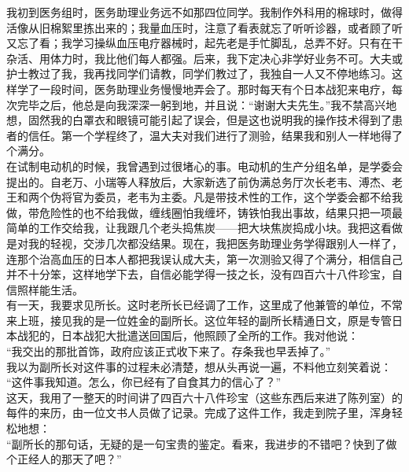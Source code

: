 我初到医务组时，医务助理业务远不如那四位同学。我制作外科用的棉球时，做得活像从旧棉絮里拣出来的；我量血压时，注意了看表就忘了听听诊器，或者顾了听又忘了看；我学习操纵血压电疗器械时，起先老是手忙脚乱，总弄不好。只有在干杂活、用体力时，我比他们每人都强。后来，我下定决心非学好业务不可。大夫或护士教过了我，我再找同学们请教，同学们教过了，我独自一人又不停地练习。这样学了一段时间，医务助理业务慢慢地弄会了。那时每天有个日本战犯来电疗，每次完毕之后，他总是向我深深一躬到地，并且说：“谢谢大夫先生。”我不禁高兴地想，固然我的白罩衣和眼镜可能引起了误会，但是这也说明我的操作技术得到了患者的信任。第一个学程终了，温大夫对我们进行了测验，结果我和别人一样地得了个满分。\\

在试制电动机的时候，我曾遇到过很堵心的事。电动机的生产分组名单，是学委会提出的。自老万、小瑞等人释放后，大家新选了前伪满总务厅次长老韦、溥杰、老王和两个伪将官为委员，老韦为主委。凡是带技术性的工作，这个学委会都不给我做，带危险性的也不给我做，缠线圈怕我缠坏，铸铁怕我出事故，结果只把一项最简单的工作交给我，让我跟几个老头捣焦炭——把大块焦炭捣成小块。我把这看做是对我的轻视，交涉几次都没结果。现在，我把医务助理业务学得跟别人一样了，连那个治高血压的日本人都把我误认成大夫，第一次测验又得了个满分，相信自己并不十分笨，这样地学下去，自信必能学得一技之长，没有四百六十八件珍宝，自信照样能生活。\\

有一天，我要求见所长。这时老所长已经调了工作，这里成了他兼管的单位，不常来上班，接见我的是一位姓金的副所长。这位年轻的副所长精通日文，原是专管日本战犯的，日本战犯大批遣送回国后，他照顾了全所的工作。我对他说：\\

“我交出的那批首饰，政府应该正式收下来了。存条我也早丢掉了。”\\

我以为副所长对这件事的过程未必清楚，想从头再说一遍，不料他立刻笑着说：\\

“这件事我知道。怎么，你已经有了自食其力的信心了？”\\

这天，我用了一整天的时间讲了四百六十八件珍宝（这些东西后来进了陈列室）的每件的来历，由一位文书人员做了记录。完成了这件工作，我走到院子里，浑身轻松地想：\\

“副所长的那句话，无疑的是一句宝贵的鉴定。看来，我进步的不错吧？快到了做个正经人的那天了吧？”